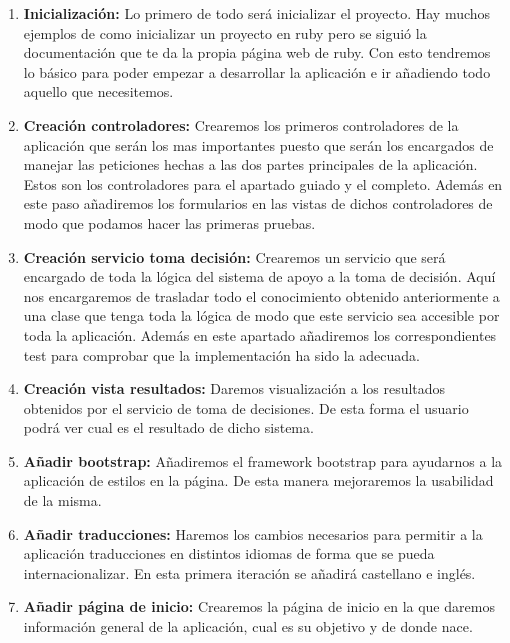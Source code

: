 \begin{enumerate}
  \item \textbf{Inicialización:} Lo primero de todo será inicializar el proyecto.
    Hay muchos ejemplos de como inicializar un proyecto en ruby pero se siguió
    la documentación que te da la propia página web de ruby. Con esto tendremos
    lo básico para poder empezar a desarrollar la aplicación e ir añadiendo todo
    aquello que necesitemos.

  \item \textbf{Creación controladores:} Crearemos los primeros controladores de
    la aplicación que serán los mas importantes puesto que serán los encargados
    de manejar las peticiones hechas a las dos partes principales de la aplicación.
    Estos son los controladores para el apartado guiado y el completo. Además
    en este paso añadiremos los formularios en las vistas de dichos controladores
    de modo que podamos hacer las primeras pruebas.

  \item \textbf{Creación servicio toma decisión:} Crearemos un servicio que será
    encargado de toda la lógica del sistema de apoyo a la toma de decisión. Aquí
    nos encargaremos de trasladar todo el conocimiento obtenido anteriormente
    a una clase que tenga toda la lógica de modo que este servicio sea accesible
    por toda la aplicación. Además en este apartado añadiremos los correspondientes
    test para comprobar que la implementación ha sido la adecuada.

  \item \textbf{Creación vista resultados:} Daremos visualización a los resultados
    obtenidos por el servicio de toma de decisiones. De esta forma el usuario podrá
    ver cual es el resultado de dicho sistema.

  \item \textbf{Añadir bootstrap:} Añadiremos el framework bootstrap para ayudarnos
    a la aplicación de estilos en la página. De esta manera mejoraremos la usabilidad de la misma.

  \item \textbf{Añadir traducciones:} Haremos los cambios necesarios para permitir
    a la aplicación traducciones en distintos idiomas de forma que se pueda
    internacionalizar. En esta primera iteración se añadirá castellano e inglés.

  \item \textbf{Añadir página de inicio:} Crearemos la página de inicio en la que
    daremos información general de la aplicación, cual es su objetivo y de donde nace.


\end{enumerate}
